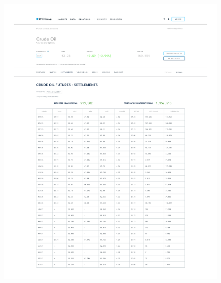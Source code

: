 \documentclass[10pt,a4paper]{article} %
\begin{document}
\begin{figure}[h]
  \centering
  \includegraphics[width=0.99\textwidth]{appendix/CRUDEOIL12SEP.pdf}
  \label{fig:crudeoil_settlements}
\end{figure}
\end{document}
